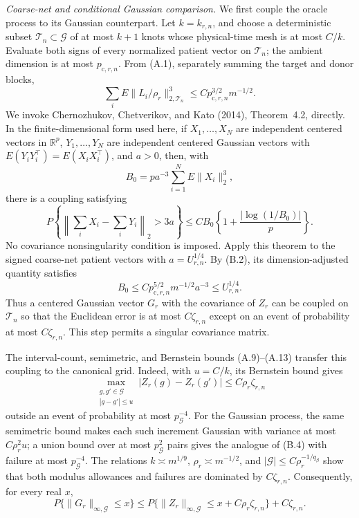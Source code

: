 \emph{Coarse-net and conditional Gaussian comparison.}
We first couple the oracle process to its Gaussian counterpart. Let \(k=k_{r,n}\), and choose a deterministic subset \(\mathcal T_n\subset\mathcal G\) of at most \(k+1\) knots whose physical-time mesh is at most \(C/k\). Evaluate both signs of every normalized patient vector on \(\mathcal T_n\); the ambient dimension is at most \(p_{\mathrm c,r,n}\). From (A.1), separately summing the target and donor blocks,
\[
 \sum_iE\|L_i/\rho_r\|_{2,\mathcal T_n}^3
 \le Cp_{\mathrm c,r,n}^{3/2}m^{-1/2}.                    \tag{B.2}
\]
We invoke Chernozhukov, Chetverikov, and Kato (2014), Theorem~4.2, directly.  In the finite-dimensional form used here, if \(X_1,\ldots,X_N\) are independent centered vectors in \(\mathbb R^p\), \(Y_1,\ldots,Y_N\) are independent centered Gaussian vectors with \(E(Y_iY_i^\top)=E(X_iX_i^\top)\), and \(a>0\), then, with
\[
 B_0=pa^{-3}\sum_{i=1}^N E\|X_i\|_2^3,
\]
there is a coupling satisfying
\[
 P\left\{\left\|\sum_iX_i-\sum_iY_i\right\|_2>3a\right\}
 \le C B_0\left\{1+\frac{|\log(1/B_0)|}{p}\right\}.
\]
No covariance nonsingularity condition is imposed.  Apply this theorem to the signed coarse-net patient vectors with \(a=U_{r,n}^{1/4}\).  By (B.2), its dimension-adjusted quantity satisfies
\[
 B_0\le C p_{\mathrm c,r,n}^{5/2}m^{-1/2}a^{-3}
 \le U_{r,n}^{1/4}.                                      \tag{B.3}
\]
Thus a centered Gaussian vector \(G_r\) with the covariance of \(Z_r\) can be coupled on \(\mathcal T_n\) so that the Euclidean error is at most \(C\zeta_{r,n}\) except on an event of probability at most \(C\zeta_{r,n}\). This step permits a singular covariance matrix.

The interval-count, semimetric, and Bernstein bounds (A.9)--(A.13) transfer this coupling to the canonical grid. Indeed, with \(u=C/k\), its Bernstein bound gives
\[
 \max_{\substack{g,g'\in\mathcal G\\|g-g'|\le u}}
 |Z_r(g)-Z_r(g')|\le C\rho_r\zeta_{r,n}                  \tag{B.4}
\]
outside an event of probability at most \(p_{\mathcal G}^{-4}\). For the Gaussian process, the same semimetric bound makes each such increment Gaussian with variance at most \(C\rho_r^2u\); a union bound over at most \(p_{\mathcal G}^2\) pairs gives the analogue of (B.4) with failure at most \(p_{\mathcal G}^{-4}\). The relations \(k\asymp m^{1/9}\), \(\rho_r\asymp m^{-1/2}\), and \(|\mathcal G|\le C\rho_r^{-1/q_\beta}\) show that both modulus allowances and failures are dominated by \(C\zeta_{r,n}\). Consequently, for every real \(x\),
\[
 P\{\|G_r\|_{\infty,\mathcal G}\le x\}
 \le P\{\|Z_r\|_{\infty,\mathcal G}
 \le x+C\rho_r\zeta_{r,n}\}+C\zeta_{r,n}.              \tag{B.5}
\]

